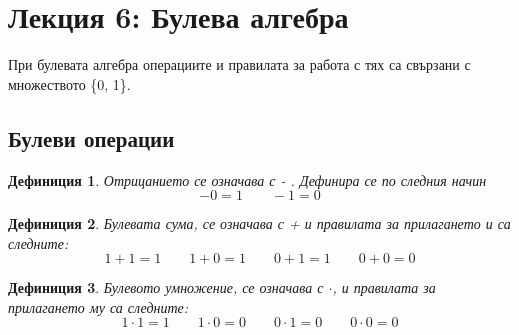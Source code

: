\documentclass[fleqn, 12pt]{article}
\newtheorem{definition}{Дефиниция}[subsection]
\theoremstyle{definition}
\begin{document}
\newpage

\section{Лекция 6: Булева алгебра }
При булевата алгебра операциите и правилата за работа с тях са свързани с множеството \{0, 1\}.
\subsection{Булеви операции}
\begin{definition}
Отрицанието се означава с - . Дефинира се по следния начин
$$-0 = 1 \qquad -1 = 0$$
\end{definition}
\begin{definition}
Булевата сума, се означава с + и правилата за прилагането и са следните:
$$1+1 = 1 \qquad 1+0 = 1 \qquad 0+1=1 \qquad 0+0 = 0$$
\end{definition}
\begin{definition}
Булевото умножение, се означава с $\cdot$, и правилата за прилагането му са следните:
$$1 \cdot 1 = 1 \qquad 1 \cdot 0 = 0 \qquad 0 \cdot 1=0 \qquad 0 \cdot 0 = 0$$
\end{definition}
\end{document}
